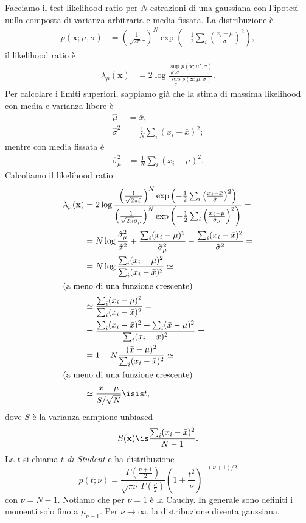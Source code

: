 

Facciamo il test likelihood ratio per $N$ estrazioni di una gaussiana
con l'ipotesi nulla composta di varianza arbitraria e media fissata.
La distribuzione è
\begin{align*}
	p(\mathbf x;\mu,\sigma)
	&= \left(\frac1{\sqrt{2\pi}\sigma}\right)^N
	\exp \left( -\frac12 \sum_i \left(\frac{x_i-\mu}{\sigma}\right)^2 \right),
\end{align*}
il likelihood ratio è
\begin{align*}
	\lambda_\mu(\mathbf x)
	&= 2\log \frac
	{\sup\limits_{\mu',\sigma} p(\mathbf x;\mu',\sigma)}
	{\sup\limits_{\sigma} p(\mathbf x;\mu,\sigma)}.
\end{align*}
Per calcolare i limiti superiori,
sappiamo già che la stima di massima likelihood con media e varianza libere è
\begin{align*}
	\hat\mu
	&= \bar x, \\
	\hat\sigma^2
	&= \frac 1N \sum_i (x_i-\bar x)^2;
\end{align*}
mentre con media fissata è
\begin{align*}
	\hat\sigma_\mu^2
	&= \frac 1N \sum_i (x_i-\mu)^2.
\end{align*}
Calcoliamo il likelihood ratio:
\begin{align*}
	\lambda_\mu(\mathbf x)
	&= 2\log \frac
	{\left(\frac1{\sqrt{2\pi}\hat\sigma}\right)^N
	\exp \left( -\frac12 \sum_i \left(\frac{x_i-\bar x}{\hat\sigma}\right)^2 \right)}
	{\left(\frac1{\sqrt{2\pi}\hat\sigma_\mu}\right)^N
	\exp \left( -\frac12 \sum_i \left(\frac{x_i-\mu}{\hat\sigma_\mu}\right)^2 \right)} = \\
	&= N \log \frac{\hat\sigma_\mu^2}{\hat\sigma^2}
	+ \frac{\sum_i (x_i-\mu)^2}{\hat\sigma_\mu^2}
	- \frac{\sum_i (x_i-\bar x)^2}{\hat\sigma^2} = \\
	&= N \log \frac
	{\sum_i (x_i - \mu)^2}
	{\sum_i (x_i - \bar x)^2} \simeq \\
	\intertext{(a meno di una funzione crescente)}
	&\simeq \frac
	{\sum_i (x_i - \mu)^2}
	{\sum_i (x_i - \bar x)^2} = \\
	&= \frac
	{\sum_i (x_i - \bar x)^2 + \sum_i (\bar x-\mu)^2}
	{\sum_i (x_i - \bar x)^2} = \\
	&= 1 + N \frac {(\bar x-\mu)^2} {\sum_i (x_i-\bar x)^2} \simeq \\
	\intertext{(a meno di una funzione crescente)}
	&\simeq \frac{\bar x - \mu}{S/\sqrt N} \isis t,
\end{align*}
dove $S$ è la varianza campione unbiased
\begin{equation*}
	S(\mathbf x)
	\is \frac {\sum_i (x_i-\bar x)^2} {N-1}.
\end{equation*}
La $t$ si chiama \emph{$t$ di Student} e ha distribuzione
\begin{equation*}
	p(t;\nu)
	= \frac {\Gamma\left(\frac{\nu+1}2\right)} {\sqrt{\pi\nu}\, \Gamma\left(\frac\nu2\right)}
	\left(1+\frac{t^2}\nu\right)^{-(\nu+1)/2}
\end{equation*}
con $\nu=N-1$.
Notiamo che per $\nu=1$ è la Cauchy.
In generale sono definiti i momenti solo fino a $\mu_{\nu-1}$.
Per $\nu\to\infty$, la distribuzione diventa gaussiana.

